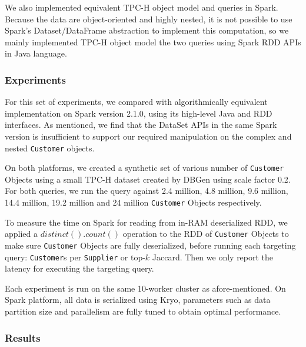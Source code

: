 We also implemented equivalent TPC-H object model and queries in
Spark. Because the data are object-oriented and highly nested, it
is not possible to use Spark's Dataset/DataFrame abstraction to
implement this computation, so we mainly implemented TPC-H object model the two queries
using Spark RDD APIs in Java language.


\subsubsection{Experiments}
For this set of experiments, we compared with algorithmically
equivalent  implementation on Spark version
2.1.0, using its high-level Java and RDD interfaces. As mentioned, we
find that the DataSet APIs in the same Spark version is insufficient
to support our required manipulation on the complex and nested
\texttt{Customer} objects.

On both platforms, we created a synthetic set of various number of \texttt{Customer}
Objects using a small TPC-H dataset created by DBGen using scale
factor 0.2. For both queries, we run the query against 2.4 million,
4.8 million, 9.6 million, 14.4 million, 19.2 million and 24 million
\texttt{Customer} Objects respectively. 

To measure the time on Spark for reading from in-RAM
deserialized RDD, we applied a $distinct().count()$ operation to
the RDD of \texttt{Customer} Objects to make sure \texttt{Customer}
Objects are fully deserialized, before running each targeting query:
\texttt{Customer}s per \texttt{Supplier} or top-$k$ Jaccard. Then we
only report the latency for executing the targeting query.

Each experiment is run on the same 10-worker cluster as
afore-mentioned. On Spark platform, all data is
serialized using Kryo, parameters such as data partition size and parallelism are fully tuned to obtain
optimal performance. 


\subsubsection{Results}



